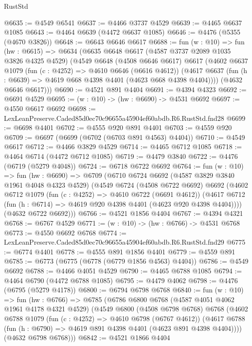\begin{lexlean}{RustStd}
\begin{coremodule}
@6635 := @4549 @6541
@6637 := @4466 @3737 @4529
@6639 := @4465 @6637 @1085
@6643 := @4464 @6639 (@4472 @6637 @1085)
@6646 := @4476 (@5355 (@4670 @3826))
@6648 := @6643 @6646 @6617
@6688 := fun (w : @10) =>
  fun (hw : @6615) =>
  @6634
    (@6635
      @6648
      @6617
      (@4587 @3737 @2089 @1035 @3826 @4325 @4529)
      (@4549
        @6648
        (@4508 @6646 @6617)
        @6617
        (@4602
          @6637
          @1079
          (fun (c : @4252) => @4610 @6646 (@6616 @4612))
          (@4617 @6637 (fun (h : @6639) => @4619 @668 @4398 @4401 (@4623 @668 @4398 @4404))))
        (@4632 @6646 @6617)))
@6690 := @4521 @891 @4404
@6691 := @4394 @4323
@6692 := @6691 @4529
@6695 := (w : @10) -> (hw : @6690) -> @4531 @6692
@6697 := @4550 @6617 @6692
@6698 := LexLeanPreserve.Caded85d0ec70c96655a45904ef60abdb.R6.RustStd.fnd28
@6699 := @6698 @4401
@6702 := @4555 @920 @891 @4401
@6703 := @4559 @920
@6709 := @6697 (@6699 (@6702 (@6703 @891 @4563) @4404))
@6710 := @4549 @6617
@6712 := @4466 @3829 @4529
@6714 := @4465 @6712 @1085
@6718 := @4464 @6714 (@4472 @6712 @1085)
@6719 := @4479 @3840
@6722 := @4476 (@6719 (@5279 @4048))
@6724 := @6718 @6722 @6692
@6764 := fun (w : @10) =>
  fun (hw : @6690) =>
  @6709
    (@6710
      @6724
      @6692
      (@4587 @3829 @3840 @1961 @4048 @4323 @4529)
      (@4549
        @6724
        (@4508 @6722 @6692)
        @6692
        (@4602
          @6712
          @1079
          (fun (c : @4252) => @4610 @6722 (@6691 @4612))
          (@4617 @6712 (fun (h : @6714) => @4619 @920 @4398 @4401 (@4623 @920 @4398 @4404))))
        (@4632 @6722 @6692)))
@6766 := @4521 @1856 @4404
@6767 := @4394 @4321
@6768 := @6767 @4529
@6771 := (w : @10) -> (hw : @6766) -> @4531 @6768
@6773 := @4550 @6692 @6768
@6774 := LexLeanPreserve.Caded85d0ec70c96655a45904ef60abdb.R6.RustStd.fnd29
@6775 := @6774 @4401
@6778 := @4555 @891 @1856 @4401
@6779 := @4559 @891
@6785 := @6773 (@6775 (@6778 (@6779 @1856 @4563) @4404))
@6786 := @4549 @6692
@6788 := @4466 @4051 @4529
@6790 := @4465 @6788 @1085
@6794 := @4464 @6790 (@4472 @6788 @1085)
@6795 := @4479 @4062
@6798 := @4476 (@6795 (@5279 @4178))
@6800 := @6794 @6798 @6768
@6840 := fun (w : @10) =>
  fun (hw : @6766) =>
  @6785
    (@6786
      @6800
      @6768
      (@4587 @4051 @4062 @1961 @4178 @4321 @4529)
      (@4549
        @6800
        (@4508 @6798 @6768)
        @6768
        (@4602
          @6788
          @1079
          (fun (c : @4252) => @4610 @6798 (@6767 @4612))
          (@4617 @6788 (fun (h : @6790) => @4619 @891 @4398 @4401 (@4623 @891 @4398 @4404))))
        (@4632 @6798 @6768)))
@6842 := @4521 @1866 @4404

\end{coremodule}
\end{lexlean}
